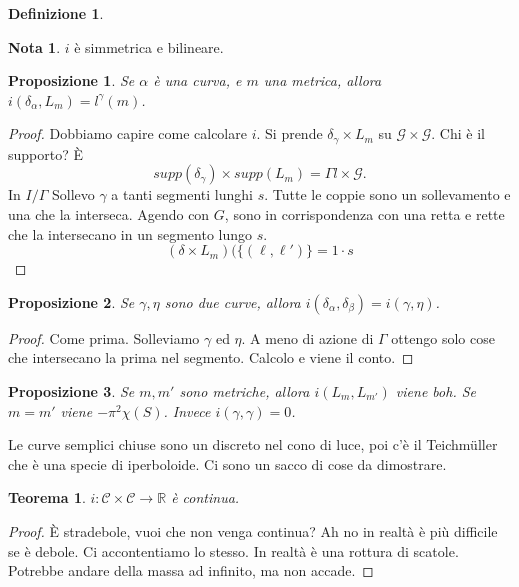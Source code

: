 \documentclass[a4paper]{article}
\newtheorem{theorem}{Teorema}
\newtheorem{proposition}{Proposizione}
\theoremstyle{definition}
\newtheorem{definition}{Definizione}
\newtheorem{remark}{Nota}
\begin{document}
\begin{definition}
    \begin{remark}
        $i$ è simmetrica e bilineare.
    \end{remark}

    \begin{proposition}
        Se $\alpha$ è una curva, e $m$ una metrica, allora $i(\delta_\alpha, L_{m}) = l^{\gamma}(m)$.
    \end{proposition}

    \begin{proof}
        Dobbiamo capire come calcolare $i$. Si prende $\delta_{\gamma}  \times L_{m}$ su $\mathcal G \times \mathcal G$. Chi è il supporto? È \[
            supp(\delta_{\gamma} ) \times supp(L_{m}) = \Gamma l \times \mathcal G.
        \]
        In $I / \Gamma$
        Sollevo $\gamma$ a tanti segmenti lunghi $s$. Tutte le coppie sono un sollevamento e una che la interseca. Agendo con $G$, sono in corrispondenza con una retta e rette che la intersecano in un segmento lungo $s$.
        \[
            (\delta \times L_{m} ) (\{(\ell, \ell')\}  = 1 \cdot s
        \]
    \end{proof}

    \begin{proposition}
        Se $\gamma, \eta$ sono due curve, allora $i(\delta_\alpha, \delta_{\beta}) = i(\gamma, \eta)$.
    \end{proposition}

    \begin{proof}
        Come prima. Solleviamo $\gamma$ ed $\eta$. A meno di azione di $\Gamma$ ottengo solo cose che intersecano la prima nel segmento. Calcolo e viene il conto.
    \end{proof}

    \begin{proposition}
        Se $m, m'$ sono metriche, allora $i(L_m, L_{m'})$ viene boh. Se $m = m'$ viene $- \pi^2 \chi(S)$. Invece $i(\gamma,\gamma) = 0$.
    \end{proposition}

    Le curve semplici chiuse sono un discreto nel cono di luce, poi c'è il Teichmüller che è una specie di iperboloide. Ci sono un sacco di cose da dimostrare.

    \begin{theorem}
        $i: \mathcal C \times \mathcal C \to \mathbb R$ è continua.
    \end{theorem}

    \begin{proof}
        È stradebole, vuoi che non venga continua? Ah no in realtà è più difficile se è debole. Ci accontentiamo lo stesso. In realtà è una rottura di scatole. Potrebbe andare della massa ad infinito, ma non accade.
    \end{proof}


\end{definition}
\end{document}
